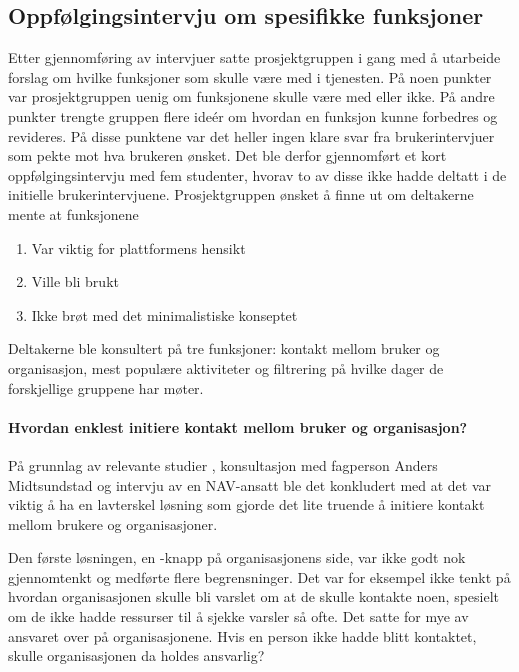 \subsection{Oppfølgingsintervju om spesifikke funksjoner}
Etter gjennomføring av intervjuer satte prosjektgruppen i gang med å utarbeide forslag om hvilke funksjoner som skulle være med i tjenesten. På noen punkter var prosjektgruppen uenig om funksjonene skulle være med eller ikke. På andre punkter trengte gruppen flere ideér om hvordan en funksjon kunne forbedres og revideres. På disse punktene var det heller ingen klare svar fra brukerintervjuer som pekte mot hva brukeren ønsket. Det ble derfor gjennomført et kort oppfølgingsintervju med fem studenter, hvorav to av disse ikke hadde deltatt i de initielle brukerintervjuene. Prosjektgruppen ønsket å finne ut om deltakerne mente at funksjonene

\begin{enumerate}
\item Var viktig for plattformens hensikt
\item Ville bli brukt
\item Ikke brøt med det minimalistiske konseptet
\end{enumerate}

Deltakerne ble konsultert på tre funksjoner: kontakt mellom bruker og organisasjon, mest populære aktiviteter og filtrering på hvilke dager de forskjellige gruppene har møter.

\paragraph{Hvordan enklest initiere kontakt mellom bruker og organisasjon?} 
På grunnlag av relevante studier %
, konsultasjon med fagperson Anders Midtsundstad \cite{MIDTSUNDSTAD-INTERVJU:15} og intervju av en NAV-ansatt \cite{NAV-INTERVJU:16} ble det konkludert med at det var viktig å ha en lavterskel løsning som gjorde det lite truende å initiere kontakt mellom brukere og organisasjoner.

Den første løsningen, en -knapp på organisasjonens side, var ikke godt nok gjennomtenkt og medførte flere begrensninger. Det var for eksempel ikke tenkt på hvordan organisasjonen skulle bli varslet om at de skulle kontakte noen, spesielt om de ikke hadde ressurser til å sjekke varsler så ofte. Det satte for mye av ansvaret over på organisasjonene. Hvis en person ikke hadde blitt kontaktet, skulle organisasjonen da holdes ansvarlig?


